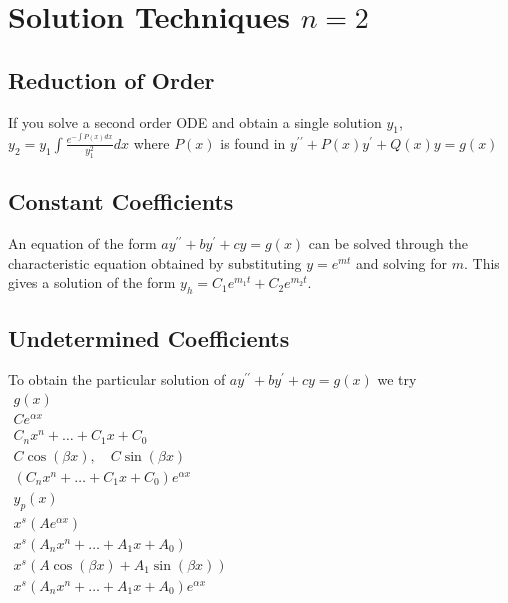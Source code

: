 \documentclass[10pt,landscape,letterpaper]{cheatsheet}
\begin{document}
\section*{Solution Techniques $n=2$}
\subsection*{Reduction of Order}
If you solve a second order ODE and obtain a single solution $y_1$, $y_2=y_1\int \frac{e^{-\int P(x)dx}}{y_1^2}dx$ where $P(x)$ is found in $y^{\prime\prime}+P(x)y^{\prime}+Q(x)y=g(x)$
\subsection*{Constant Coefficients}
An equation of the form $ay^{\prime\prime}+by^{\prime}+cy=g(x)$ can be solved through the characteristic equation obtained by substituting $y=e^{mt}$ and solving for $m$.
This gives a solution of the form $y_h=C_1e^{m_1t}+C_2e^{m_2t}$.
\subsection*{Undetermined Coefficients}
To obtain the particular solution of $ay^{\prime\prime}+by^{\prime}+cy=g(x)$ we try 
$
        \begin{array}{|c|}
                \hline
                g(x)                                                                  \\ 
                \hline
                Ce^{\alpha x}                                                         \\
                C_nx^n+\dots+C_1x+C_0                                                 \\
                C\cos\left(\beta x\right), \quad C\sin\left(\beta x\right)            \\
                \left(C_nx^n+\dots+C_1x+C_0\right)e^{\alpha x}                        \\
                \hline
                y_p(x)                                                                \\
                \hline
                x^s\left(Ae^{\alpha x}\right)                                         \\
                x^s\left(A_nx^n+\dots+A_1x+A_0\right)                                 \\
                x^s\left(A\cos\left(\beta x\right)+A_1\sin\left(\beta x\right)\right) \\
                x^s\left(A_nx^n+\dots+A_1x+A_0\right)e^{\alpha x}                     
        \end{array}
$
\end{document}
